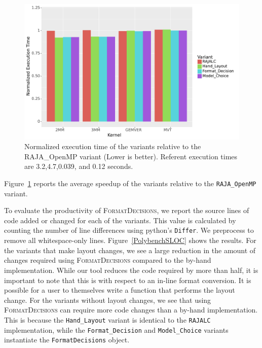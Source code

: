 \documentclass[sigconf,review=true]{acmart}
\newcommand{\FormatDecisions}[0]{{\textsc{FormatDecisions}}}
\begin{document}
\begin{figure}
	\includegraphics[width=\columnwidth]{PolybenchPerfPlot.pdf}
	\caption{Normalized execution time of the variants relative to the RAJA\_OpenMP variant (Lower is better). Referent execution times are 3.2,4.7,0.039, and 0.12 seconds.}
	\label{PolybenchPerformance}
\end{figure}

Figure~\ref{PolybenchPerformance} reports the average speedup of the variants relative to the \verb.RAJA_OpenMP. variant. 



To evaluate the productivity of \textsc{FormatDecisions}, we report the source lines of code added or changed for each of the variants.
This value is calculated by counting the number of line differences using python's \verb.Differ.. 
We preprocess to remove all whitespace-only lines.
Figure~\ref{PolybenchSLOC} shows the results.
For the variants that make layout changes, we see a large reduction in the amount of changes required using \FormatDecisions{} compared to the by-hand implementation. 
While our tool reduces the code required by more than half, it is important to note that this is with respect to an in-line format conversion.
It is possible for a user to themselves write a function that performs the layout change.
For the variants without layout changes, we see that using \FormatDecisions{} can require more code changes than a by-hand implementation. 
This is because the \verb.Hand_Layout. variant is identical to the \verb.RAJALC. implementation, while the \verb.Format_Decision. and \verb.Model_Choice. variants instantiate the \verb.FormatDecisions. object.
\end{document}
